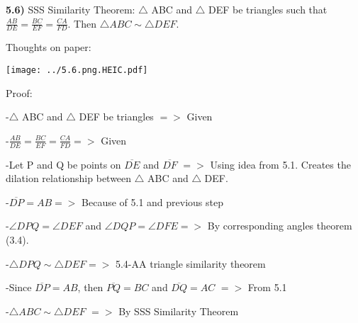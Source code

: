 \documentclass{article}
\begin{document}
\newpage

\textbf{5.6)} SSS Similarity Theorem: $\triangle$ ABC and $\triangle$ DEF be triangles such that $\frac{AB}{DE}=\frac{BC}{EF}=\frac{CA}{FD}$. Then $\triangle ABC \sim \triangle DEF$.

\vspace{2mm}

Thoughts on paper:

\vspace{2mm}

\texttt{[image: ../5.6.png.HEIC.pdf]}

\vspace{2mm}


Proof:

\vspace{2mm}

-$\triangle$ ABC and $\triangle$ DEF be triangles $=>$ Given

\vspace{2mm}

-$\frac{AB}{DE}=\frac{BC}{EF}=\frac{CA}{FD} =>$ Given

\vspace{2mm}

-Let P and Q be points on $\overline{DE}$ and $\overline{DF}$  $=>$ Using idea from 5.1. Creates the dilation relationship between $\triangle$ ABC and $\triangle$ DEF.

\vspace{2mm}

-$\overline{DP}=AB =>$ Because of 5.1 and previous step

\vspace{2mm}

-$\angle DPQ=\angle DEF$ and  $\angle DQP=\angle DFE =>$ By corresponding angles theorem (3.4).

\vspace{2mm}

-$\triangle DPQ \sim \triangle DEF =>$ 5.4-AA triangle similarity theorem

\vspace{2mm}

-Since $\overline{DP}=AB$, then $\overline{PQ}=BC$ and $\overline{DQ}=AC$ $=>$ From 5.1

\vspace{2mm}

-$\triangle ABC \sim \triangle DEF$ $=>$ By SSS Similarity Theorem



\newpage
\end{document}
